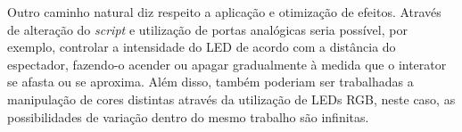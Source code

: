 Outro caminho natural diz respeito a aplicação e otimização de efeitos. Através de alteração do \textit{script} e utilização de portas analógicas seria possível, por exemplo, controlar a intensidade do LED de acordo com a distância do espectador, fazendo-o acender ou apagar gradualmente à medida que o interator se afasta ou se aproxima. Além disso, também poderiam ser trabalhadas a manipulação de cores distintas através da utilização de LEDs RGB, neste caso, as possibilidades de variação dentro do mesmo trabalho são infinitas.

